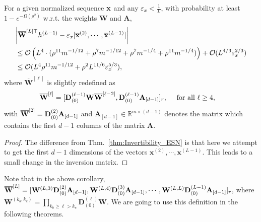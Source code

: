 \begin{corollary}\label{cor:Invertibility_ESN}
	For a given normalized sequence $\mathbf{x}$ and any $\varepsilon_x < \frac{1}{L}$, with probability at least $1 - e^{-\Omega(\rho^2)}$ w.r.t. the weights $\mathbf{W}$ and $\mathbf{A}$,
	\begin{align*} 
	&\abs{\overline{\mathbf{W}}^{[L]\top} h^{(L-1)} - \varepsilon_x[\overline{\mathbf{x}}^{(2)}, 
			\cdots, \overline{\mathbf{x}}^{(L-1)}]}  \\&\le \mathcal{O}\left(L^4 \cdot (\rho^{11} m^{-1/12} + \rho^{7} m^{-1/12} + \rho^{7} m^{-1/4} + \rho^{11} m^{-1/4})  \right) + \mathcal{O}(L^{4/3} \varepsilon_x^{2/3}) \\&
		\le  \mathcal{O}(L^4 \rho^{11} m^{-1/12} + \rho^2 L^{11/6} \varepsilon_x^{5/3}), 
	\end{align*}
	where $\overline{{\mathbf{W}}}^{[\ell]}$ is slightly redefined as
	\begin{align*}
		&\overline{\mathbf{W}}^{[\ell]} = [\mathbf{D}^{(\ell-1)}_{(0)} \mathbf{W} \overline{\mathbf{W}}^{[\ell - 2]},  \mathbf{D}_{(0)}^{(\ell-1)}\mathbf{A}_{[d-1]}]_r, \quad \text{ for all } \ell \ge 4,
	\end{align*}
	with $\overline{\mathbf{W}}^{[2]} = \mathbf{D}^{(2)}_{(0)} \mathbf{A}_{[d-1]}$
	and $\mathbf{A}_{[d-1]}  \in \mathbb{R}^{m \times (d-1)}$ denotes the matrix which contains the first $d-1$ columns of the matrix $\mathbf{A}$.
\end{corollary}
\begin{proof}
	The difference from Thm.~\ref{thm:Invertibility_ESN} is that here we attempt to get the first $d-1$ dimensions of the vectors $\mathbf{x}^{(2)}, \cdots, \mathbf{x}^{(L-1)}$. This leads to a small change in the inversion matrix.
\end{proof}

Note that in the above corollary, $\overline{\mathbf{W}}^{[L]} = [\mathbf{W}^{(L, 3)} \mathbf{D}_{(0)}^{(2)}\mathbf{A}_{[d-1]}, \mathbf{W}^{(L, 4)} \mathbf{D}_{(0)}^{(3)}\mathbf{A}_{[d-1]}, \cdots, \mathbf{W}^{(L, L)} 
	\mathbf{D}_{(0)}^{(L-1)}\mathbf{A}_{[d-1]}]_r$, where $\mathbf{W}^{(k_b, k_e)} = \prod_{k_b \ge \ell > k_e} \mathbf{D}_{(0)}^{(\ell)} \mathbf{W}$. We are going to use this definition in the following theorems.